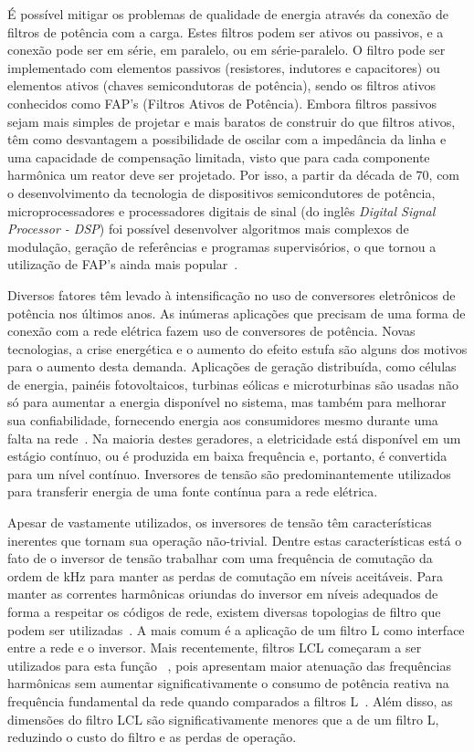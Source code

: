 	É possível mitigar os problemas de qualidade de energia através da conexão de filtros de potência com a carga. Estes filtros podem ser ativos ou passivos, e a conexão pode ser em série, em paralelo, ou em série-paralelo. O filtro pode ser implementado com elementos passivos (resistores, indutores e capacitores) ou elementos ativos (chaves semicondutoras de potência), sendo os filtros ativos conhecidos como FAP's (Filtros Ativos de Potência). Embora filtros passivos sejam mais simples de projetar e mais baratos de construir do que filtros ativos, têm como desvantagem a possibilidade de oscilar com a impedância da linha e uma capacidade de compensação limitada, visto que para cada componente harmônica um reator deve ser projetado. Por isso, a partir da década de $70$, com o desenvolvimento da tecnologia de dispositivos semicondutores de potência, microprocessadores e processadores digitais de sinal (do inglês \emph{Digital Signal Processor - DSP}) foi possível desenvolver algoritmos mais complexos de modulação, geração de referências e programas supervisórios, o que tornou a utilização de FAP's ainda mais popular~\cite{ref:SASAKI}.

	Diversos fatores têm levado à intensificação no uso de conversores eletrônicos	de potência nos últimos anos. As inúmeras aplicações que precisam de uma forma de conexão com a rede elétrica fazem uso de conversores de potência. Novas tecnologias, a crise energética e o aumento do efeito estufa são alguns dos motivos para o aumento desta demanda. Aplicações de geração distribuída, como células de energia,	painéis fotovoltaicos, turbinas eólicas e microturbinas são usadas não só para aumentar a energia disponível no sistema, mas também para melhorar sua confiabilidade, fornecendo energia aos consumidores mesmo durante uma falta na rede~\cite{ref:KARSHENAS}.	Na maioria destes geradores, a eletricidade está disponível em um estágio contínuo, ou é produzida em baixa frequência e, portanto, é convertida para um nível contínuo. Inversores de tensão são predominantemente utilizados para transferir energia de uma fonte contínua para a rede elétrica.

	Apesar de vastamente utilizados, os inversores de tensão têm características inerentes que tornam sua operação não-trivial. Dentre estas características está o fato de o inversor de tensão trabalhar com uma frequência de comutação da ordem de kHz para manter as perdas de comutação em níveis aceitáveis. Para manter as correntes harmônicas oriundas do inversor em níveis adequados de forma a respeitar os códigos de rede, existem diversas topologias de filtro que podem ser utilizadas~\cite{ref:RIBEIRO}. A mais comum é a aplicação de um filtro L como interface entre a rede e o inversor. Mais recentemente, filtros LCL começaram a ser utilizados para esta função~\cite{ref:LINDGREN}\cite{ref:TEODORESCU} \cite{ref:XU}, pois apresentam maior atenuação das frequências harmônicas sem aumentar significativamente o consumo de potência reativa na frequência fundamental da rede quando comparados a filtros L~\cite{ref:FUCHS}. Além disso, as dimensões do filtro LCL são significativamente menores que a de um filtro L, reduzindo o custo do filtro e as perdas de operação.

